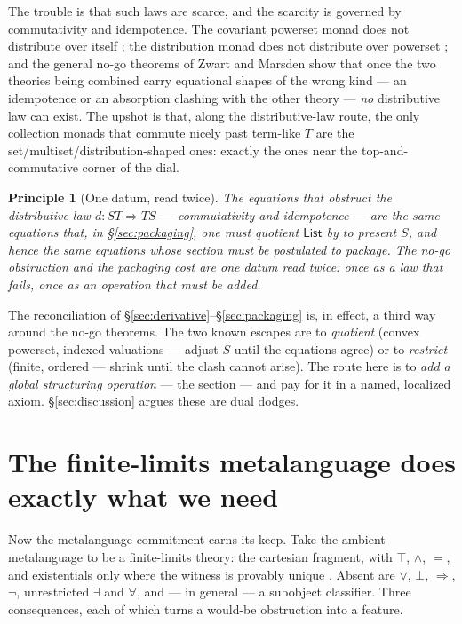 \documentclass[11pt]{article}
\theoremstyle{definition}
\theoremstyle{plain}
\newtheorem{principle}[definition]{Principle}
\newcommand{\T}{T}
\newcommand{\Coll}{S}
\newcommand{\List}{\mathsf{List}}
\begin{document}
The trouble is that such laws are scarce, and the scarcity is governed by
commutativity and idempotence. The covariant powerset monad does not
distribute over itself \cite{KlinSalamanca18}; the distribution monad does not
distribute over powerset \cite{VaraccaWinskel06}; and the general no-go
theorems of Zwart and Marsden \cite{ZwartMarsden19} show that once the two
theories being combined carry equational shapes of the wrong kind --- an
idempotence or an absorption clashing with the other theory --- \emph{no}
distributive law can exist. The upshot is that, along the distributive-law
route, the only collection monads that commute nicely past term-like $\T$ are
the set/multiset/distribution-shaped ones: exactly the ones near the
top-and-commutative corner of the dial.

\begin{principle}[One datum, read twice]
\label{prin:twice}
The equations that obstruct the distributive law $d : \Coll\T \Rightarrow
\T\Coll$ --- commutativity and idempotence --- are the same equations that,
in \S\ref{sec:packaging}, one must quotient $\List$ by to present $\Coll$, and
hence the same equations whose section must be postulated to package. The
no-go obstruction and the packaging cost are one datum read twice: once as a
law that fails, once as an operation that must be added.
\end{principle}

The reconciliation of \S\ref{sec:derivative}--\S\ref{sec:packaging} is, in
effect, a third way around the no-go theorems. The two known escapes are to
\emph{quotient} (convex powerset, indexed valuations --- adjust $\Coll$ until
the equations agree) or to \emph{restrict} (finite, ordered --- shrink until
the clash cannot arise). The route here is to \emph{add a global structuring
operation} --- the section --- and pay for it in a named, localized axiom.
\S\ref{sec:discussion} argues these are dual dodges.

\section{The finite-limits metalanguage does exactly what we need}
\label{sec:finlim}

Now the metalanguage commitment earns its keep. Take the ambient metalanguage
to be a finite-limits theory: the cartesian fragment, with $\top$, $\wedge$,
$=$, and existentials only where the witness is provably unique
\cite{Freyd72,GabrielUlmer71,PalmgrenVickers07}. Absent are $\vee$, $\bot$,
$\Rightarrow$, $\neg$, unrestricted $\exists$ and $\forall$, and --- in
general --- a subobject classifier. Three consequences, each of which turns a
would-be obstruction into a feature.
\end{document}
